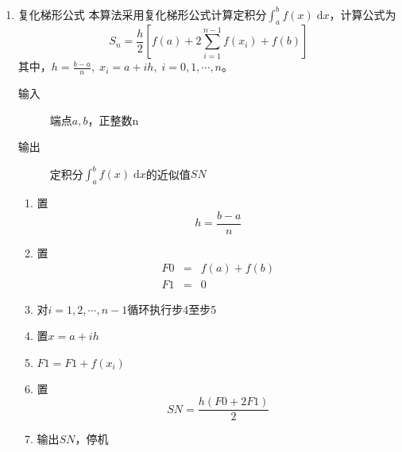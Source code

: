 \documentclass[a4paper,11pt]{article}
\begin{document}
	\begin{enumerate}
		\item 复化梯形公式
			本算法采用复化梯形公式计算定积分$\int_{a}^{b}f(x)\;\mathrm{d}x$，计算公式为
			\begin{displaymath}
				S_{n}=\frac{h}{2}\left[f(a)+2\sum\limits_{i=1}^{n-1}f(x_{i})+f(b)\right]
			\end{displaymath}
			其中，$h=\frac{b-a}{n},\;x_i=a+ih,\;i=0,1,\cdots,n$。
			\begin{description}
				\item[输入 ] 端点$a,b$，正整数n
				\item[输出 ] 定积分$\int_{a}^{b}f(x)\;\mathrm{d}x$的近似值$SN$
			\end{description}
			\begin{enumerate}[(1)]
				\item 置
					\begin{displaymath}
						h=\frac{b-a}{n}
					\end{displaymath}
				\item 置
					\begin{eqnarray}
						F0 & = & f(a)+f(b)\nonumber\\
						F1 & = & 0\nonumber
					\end{eqnarray}
				\item 对$i=1,2,\cdots,n-1$循环执行步4至步5
				\item 置$x=a+ih$
				\item $F1=F1+f(x_i)$
				\item 置
					\begin{displaymath}
						SN=\frac{h(F0+2F1)}{2}
					\end{displaymath}
				\item 输出$SN$，停机
			\end{enumerate}


\end{enumerate}
\end{document}
